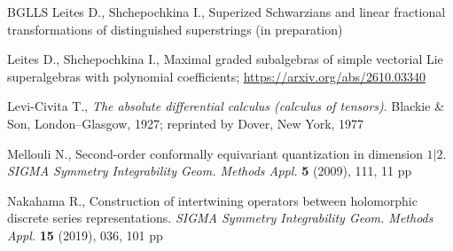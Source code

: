 \documentclass[12pt,a4paper]{amsart}
\theoremstyle{thm}
\theoremstyle{definition}
\begin{document}
\begin{thebibliography}{BGLLS}
Leites D., Shchepochkina I., Superized Schwarzians and linear fractional transformations of distinguished superstrings (in preparation)  %






Leites D., Shchepochkina I., Maximal graded subalgebras of simple vectorial Lie superalgebras
with polynomial coefficients; \url{https://arxiv.org/abs/2610.03340}%

Levi-Civita T., \textit{The absolute differential calculus \textup{(}calculus of tensors\textup{)}}.
Blackie \& Son, London--Glasgow, 1927; reprinted by Dover, New York, 1977

Mellouli N., Second-order conformally equivariant quantization in dimension $1|2$.
\textit{SIGMA Symmetry Integrability Geom. Methods Appl.} \textbf{5} (2009), 111, 11 pp

Nakahama R., Construction of intertwining operators between holomorphic discrete series
representations. \textit{SIGMA Symmetry Integrability Geom. Methods Appl.} \textbf{15}
(2019), 036, 101 pp


\end{thebibliography}
\end{document}
